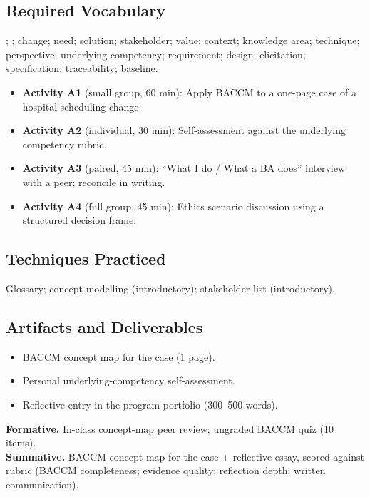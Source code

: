 \documentclass[11pt,letterpaper,oneside]{report}
\begin{document}
\subsection*{Required Vocabulary}
; ; change; need; solution; stakeholder; value; context; knowledge area; technique; perspective; underlying competency; requirement; design; elicitation; specification; traceability; baseline.

\begin{labbox}
\begin{itemize}
  \item \textbf{Activity A1} (small group, 60 min): Apply BACCM to a one-page case of a hospital scheduling change.
  \item \textbf{Activity A2} (individual, 30 min): Self-assessment against the underlying competency rubric.
  \item \textbf{Activity A3} (paired, 45 min): ``What I do / What a BA does'' interview with a peer; reconcile in writing.
  \item \textbf{Activity A4} (full group, 45 min): Ethics scenario discussion using a structured decision frame.
\end{itemize}
\end{labbox}

\subsection*{Techniques Practiced}
Glossary; concept modelling (introductory); stakeholder list (introductory).

\subsection*{Artifacts and Deliverables}
\begin{itemize}
  \item BACCM concept map for the case (1 page).
  \item Personal underlying-competency self-assessment.
  \item Reflective entry in the program portfolio (300--500 words).
\end{itemize}

\begin{curriculumassessment}
\textbf{Formative.} In-class concept-map peer review; ungraded BACCM quiz (10 items).\\[3pt]
\textbf{Summative.} BACCM concept map for the case + reflective essay, scored against rubric  (BACCM completeness; evidence quality; reflection depth; written communication).
\end{curriculumassessment}
\end{document}
